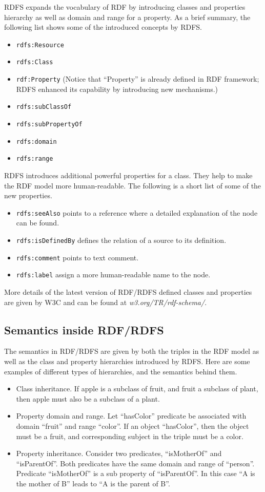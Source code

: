 RDFS expands the vocabulary of RDF by introducing classes and properties hierarchy as well as domain and range for a property. As a brief summary, the following list shows some of the introduced concepts by RDFS.
\begin{itemize}
	\item \verb|rdfs:Resource|
	\item \verb|rdfs:Class|
	\item \verb|rdf:Property| (Notice that ``Property'' is already defined in RDF framework; RDFS enhanced its capability by introducing new mechanisms.)
	\item \verb|rdfs:subClassOf|
	\item \verb|rdfs:subPropertyOf|
	\item \verb|rdfs:domain|
	\item \verb|rdfs:range|
\end{itemize}

RDFS introduces additional powerful properties for a class. They help to make the RDF model more human-readable. The following is a short list of some of the new properties.
\begin{itemize}
	\item \verb|rdfs:seeAlso| points to a reference where a detailed explanation of the node can be found.
	\item \verb|rdfs:isDefinedBy| defines the relation of a source to its definition.
	\item \verb|rdfs:comment| points to text comment.
	\item \verb|rdfs:label| assign a more human-readable name to the node.
\end{itemize}

More details of the latest version of RDF/RDFS defined classes and properties are given by W3C and can be found at \textit{w3.org/TR/rdf-schema/}.

\subsection{Semantics inside RDF/RDFS}

The semantics in RDF/RDFS are given by both the triples in the RDF model as well as the class and property hierarchies introduced by RDFS. Here are some examples of different types of hierarchies, and the semantics behind them.
\begin{itemize}
	\item Class inheritance. If apple is a subclass of fruit, and fruit a subclass of plant, then apple must also be a subclass of a plant.
	\item Property domain and range. Let ``hasColor'' predicate be associated with domain ``fruit'' and range ``color''. If an object ``hasColor'', then the object must be a fruit, and corresponding subject in the triple must be a color.
	\item Property inheritance. Consider two predicates, ``isMotherOf'' and ``isParentOf''. Both predicates have the same domain and range of ``person''. Predicate ``isMotherOf'' is a sub property of ``isParentOf''. In this case ``A is the mother of B'' leads to ``A is the parent of B''.
\end{itemize}

